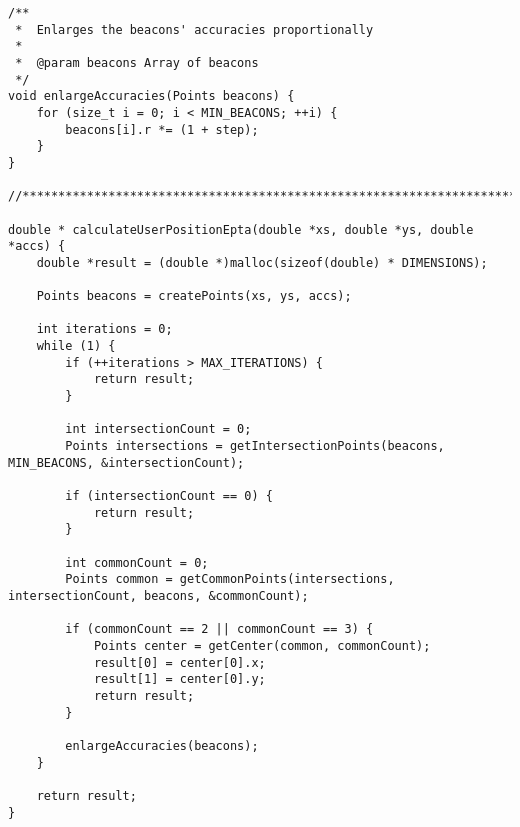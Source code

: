 \begin{lstlisting}
/**
 *  Enlarges the beacons' accuracies proportionally
 *
 *  @param beacons Array of beacons
 */
void enlargeAccuracies(Points beacons) {
    for (size_t i = 0; i < MIN_BEACONS; ++i) {
        beacons[i].r *= (1 + step);
    }
}

//************************************************************************

double * calculateUserPositionEpta(double *xs, double *ys, double *accs) {
    double *result = (double *)malloc(sizeof(double) * DIMENSIONS);

    Points beacons = createPoints(xs, ys, accs);

    int iterations = 0;
    while (1) {
        if (++iterations > MAX_ITERATIONS) {
            return result;
        }
        
        int intersectionCount = 0;
        Points intersections = getIntersectionPoints(beacons, MIN_BEACONS, &intersectionCount);
        
        if (intersectionCount == 0) {
            return result;
        }
        
        int commonCount = 0;
        Points common = getCommonPoints(intersections, intersectionCount, beacons, &commonCount);
        
        if (commonCount == 2 || commonCount == 3) {
            Points center = getCenter(common, commonCount);
            result[0] = center[0].x;
            result[1] = center[0].y;
            return result;
        }
        
        enlargeAccuracies(beacons);
    }
    
    return result;
}
\end{lstlisting}